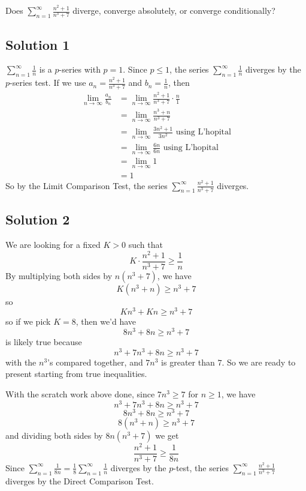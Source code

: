 \documentclass{article}
\begin{document}
\noindent
Does $\displaystyle \sum_{n=1}^\infty \frac{n^2+1}{n^3+7}$
diverge, converge absolutely, or converge conditionally?

\subsection*{Solution 1}

$\displaystyle \sum_{n=1}^\infty \frac1n$ is a $p$-series with $p=1$. Since $p \leq 1$, the series $\displaystyle \sum_{n=1}^\infty \frac1n$ diverges by the $p$-series test. If we use $a_n = \frac{n^2+1}{n^3+7}$ and $b_n = \frac1n$, then
\begin{align*}
\lim_{n \to \infty} \frac{a_n}{b_n}
&= \lim_{n \to \infty} \frac{n^2+1}{n^3+7} \cdot \frac{n}{1}\\
&= \lim_{n \to \infty} \frac{n^3+n}{n^3+7} \\
&= \lim_{n \to \infty} \frac{3n^2+1}{3n^2} \text{ using L'hopital}\\
&= \lim_{n \to \infty} \frac{6n}{6n} \text{ using L'hopital}\\
&= \lim_{n \to \infty} 1\\
&= 1
\end{align*}
So by the Limit Comparison Test, the series $\displaystyle \sum_{n=1}^\infty \frac{n^2+1}{n^3+7}$ diverges.


\subsection*{Solution 2}

We are looking for a fixed $K > 0$ such that 
\[ K \cdot  \frac{n^2+1}{n^3+7} \geq \frac1n\]
By multiplying both sides by $n(n^3+7)$, we have
\[ K(n^3 + n) \geq n^3+7\]
so
\[ Kn^3 + Kn \geq n^3+7\]
so
if we pick $K=8$, then we'd have
\[ 8n^3 + 8n \geq n^3+7\]
is likely true because 
\[ n^3+ 7n^3 + 8n \geq n^3+7\]
with the $n^3$'s compared together, and $7n^3$ is greater than $7$. So we are ready to present starting from true inequalities.

With the scratch work above done, since $7n^3 \geq 7$ for $n \geq 1$, we have
\[ n^3+ 7n^3 + 8n \geq n^3+7\]
\[ 8n^3 + 8n \geq n^3+7\]
\[ 8(n^3 + n) \geq n^3+7\]
and dividing both sides by $8n(n^3+7)$ we get
\[\frac{n^2+1}{n^3+7} \geq \frac1{8n}\]
Since $\displaystyle \sum_{n=1}^\infty \frac1{8n} = \frac18\sum_{n=1}^\infty \frac1{n}$ diverges by the $p$-test, the series 
$\displaystyle \sum_{n=1}^\infty \frac{n^2+1}{n^3+7}$ diverges by the Direct Comparison Test.
\end{document}

